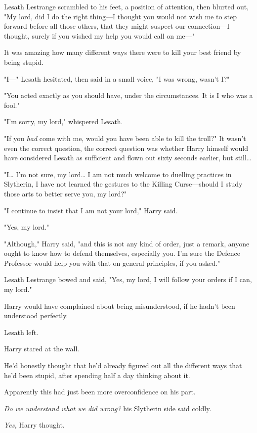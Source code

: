 Lesath Lestrange scrambled to his feet, a position of attention, then blurted
out, "My lord, did I do the right thing---I thought you would not wish me to
step forward before all those others, that they might suspect our
connection---I thought, surely if you wished my help you would call on me---"

It was amazing how many different ways there were to kill your best friend by
being stupid.

"I---" Lesath hesitated, then said in a small voice, "I was wrong, wasn't I?"

"You acted exactly as you should have, under the circumstances. It is I who was
a fool."

"I'm sorry, my lord," whispered Lesath.

"If you \emph{had} come with me, would you have been able to kill the troll?"
It wasn't even the correct question, the correct question was whether Harry
himself would have considered Lesath as sufficient and flown out sixty seconds
earlier, but still{\ldots}

"I{\ldots} I'm not sure, my lord{\ldots} I am not much welcome to duelling
practices in Slytherin, I have not learned the gestures to the Killing
Curse---should I study those arts to better serve you, my lord?"

"I continue to insist that I am not your lord," Harry said.

"Yes, my lord."

"Although," Harry said, "and this is not any kind of order, just a remark,
anyone ought to know how to defend themselves, especially you. I'm sure the
Defence Professor would help you with that on general principles, if you asked."

Lesath Lestrange bowed and said, "Yes, my lord, I will follow your orders if I
can, my lord."

Harry would have complained about being misunderstood, if he hadn't been
understood perfectly.

Lesath left.

Harry stared at the wall.

He'd honestly thought that he'd already figured out all the different ways that
he'd been stupid, after spending half a day thinking about it.

Apparently this had just been more overconfidence on his part.

\emph{Do we understand what we did wrong?} his Slytherin side said coldly.

\emph{Yes,} Harry thought.

